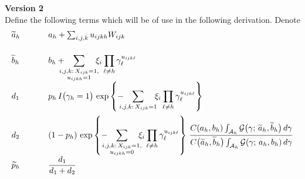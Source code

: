 \documentclass[11pt]{article}
\newcommand{\ind}{I}
\newcommand{\gammaExprNoH}{ -\hspace{3mm} \sum_{\mathclap{i,j,k{:}\, X_{ijk}=1}} \hspace{4mm} \xi_i \prod_{\ell \ne h} \gamma_\ell^{ u_{ijk\ell} } }
\newcommand{\gammaExprUisZero}{ \hspace{3mm} \sum_{\mathclap{\substack{i,j,k{:}\, X_{ijk}=1, \\ u_{ijkh} = 0}}} \hspace{4mm} \xi_i \prod_{\ell \ne h} \gamma_\ell^{ u_{ijk\ell} } }
\newcommand{\gammaExprUisOne}{ \hspace{3mm} \sum_{\mathclap{\substack{i,j,k{:}\, X_{ijk}=1, \\ u_{ijkh} = 1}}} \hspace{4mm} \xi_i \prod_{\ell \ne h} \gamma_\ell^{ u_{ijk\ell} } }
\begin{document}
\begin{enumerate}[label=Step \arabic*., leftmargin=13mm, itemsep=10mm]
\textbf{Version 2} \\[2ex]
Define the following terms which will be of use in the following derivation.  Denote \vspace{2mm}
\[ \begin{array}{lll}
\widetilde{a}_h & & a_h + \sum_{i,j,k} u_{ijkh} W_{ijk} \\[4ex]
\widetilde{b}_h & & \displaystyle b_h + \gammaExprUisOne  \\[4ex]
d_1 & \hspace{5mm} & \displaystyle p_h\, \ind\big( \gamma_h = 1 \big)\, \exp\left\{ \gammaExprNoH \right\} \\[4ex]
d_2 &  & \displaystyle (1 - p_h)\, \exp\left\{ -\gammaExprUisZero \right\}\, \frac{ C(a_h,b_h) \int_{\mathcal{A}_h} \mathcal{G}\big(\gamma;\, \widetilde{a}_h, \widetilde{b}_h\big)\, d\gamma }{ C\big(\widetilde{a}_h, \widetilde{b}_h\big) \int_{\mathcal{A}_h} \mathcal{G}(\gamma;\, a_h, b_h)\, d\gamma } \\[4ex]
\widetilde{p}_h & & \displaystyle \frac{ d_1 }{ d_1 + d_2 }
\end{array} \] \vspace{2mm}


\end{enumerate}
\end{document}
